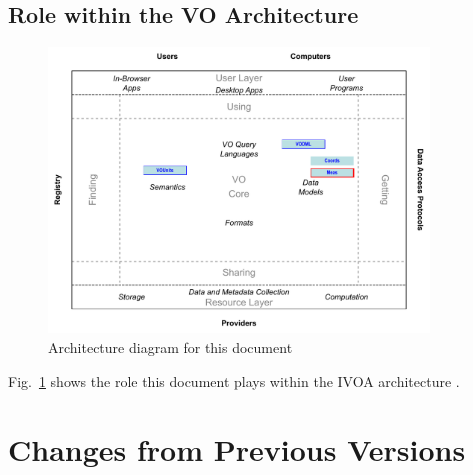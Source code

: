 \documentclass[11pt,a4paper]{ivoa}
\begin{document}
\pagebreak
\subsection{Role within the VO Architecture}

\begin{figure}[h]
\centering


\includegraphics[width=0.9\textwidth]{role_diagram.pdf}
\caption{Architecture diagram for this document}
\label{fig:archdiag}
\end{figure}

Fig.~\ref{fig:archdiag} shows the role this document plays within the
IVOA architecture \citep{2010ivoa.rept.1123A}.




\pagebreak
\appendix
\section{Changes from Previous Versions}


\end{document}
